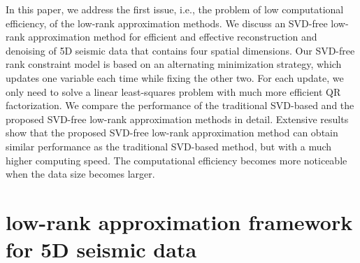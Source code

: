 In this paper, we address the first issue, i.e., the problem of low computational efficiency, of the low-rank approximation methods. We discuss an SVD-free low-rank approximation method for efficient and effective reconstruction and denoising of 5D seismic data that contains four spatial dimensions. Our SVD-free rank constraint model is based on an alternating minimization strategy, which updates one variable each time while fixing the other two. For each update, we only need to solve a linear least-squares problem with much more efficient QR factorization. We compare the performance of the traditional SVD-based and the proposed SVD-free low-rank approximation methods in detail. Extensive results show that the proposed SVD-free low-rank approximation method can obtain similar performance as the traditional SVD-based method, but with a much higher computing speed. The computational efficiency becomes more noticeable when the data size becomes larger. 


\section{low-rank approximation framework for 5D seismic data}

